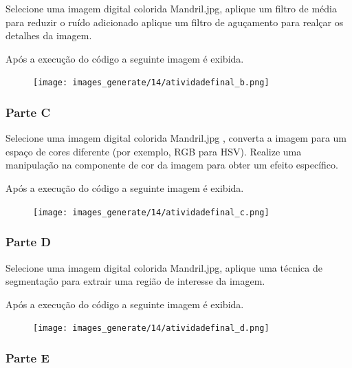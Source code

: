 \documentclass[10pt,a4paper]{article}
\begin{document}
Selecione uma imagem digital colorida Mandril.jpg, aplique um filtro de média para reduzir o ruído adicionado aplique um filtro de aguçamento para realçar os detalhes da imagem. 



Após a execução do código a seguinte imagem é exibida.

\begin{figure}[H]
    \centering
    {{\texttt{[image: images\_generate/14/atividadefinal\_b.png]}}}
\end{figure}


\subsubsection{Parte C}

Selecione uma imagem digital colorida Mandril.jpg , converta a imagem para um espaço de cores diferente (por exemplo, RGB para HSV). Realize uma manipulação na componente de cor da imagem para obter um efeito específico. 



Após a execução do código a seguinte imagem é exibida.

\begin{figure}[H]
    \centering
    {{\texttt{[image: images\_generate/14/atividadefinal\_c.png]}}}
\end{figure}



\subsubsection{Parte D}

Selecione uma imagem digital colorida Mandril.jpg, aplique uma técnica de segmentação para extrair uma região de interesse da imagem.



Após a execução do código a seguinte imagem é exibida.

\begin{figure}[H]
    \centering
    {{\texttt{[image: images\_generate/14/atividadefinal\_d.png]}}}
\end{figure}


\subsubsection{Parte E}
\end{document}
